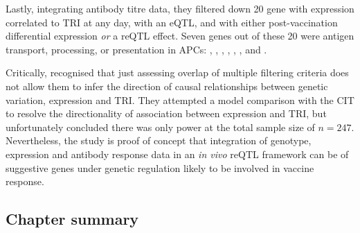 Lastly, integrating antibody titre data,
they filtered down 20 gene with expression correlated to \gls{TRI} at any day, 
with an \gls{eQTL}, 
and with either post-vaccination differential expression \emph{or} a \gls{reQTL} effect.
Seven genes out of these 20 were
antigen transport, processing, or presentation in \glspl{APC}:
, , , , , , and .

Critically, \textcite{franco2013IntegrativeGenomicAnalysis} recognised that just assessing overlap of multiple filtering criteria does not allow them to infer the direction of causal relationships between genetic variation, expression and \gls{TRI}.
They attempted a model comparison with the CIT \autocite{millstein2009DisentanglingMolecularRelationships} to resolve the directionality of association between expression and \gls{TRI}, but unfortunately concluded there was only  power at the total sample size of $n=247$.
Nevertheless, the study is proof of concept that integration of genotype, expression and antibody response data in an \textit{in vivo} \gls{reQTL} framework can be of suggestive genes under genetic regulation likely to be involved in vaccine response.

\subsection{Chapter summary}

